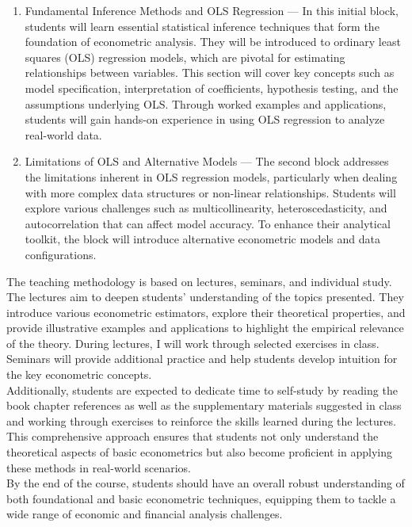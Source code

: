 \documentclass[12pt]{article}
\begin{document}
\begin{enumerate}
    \item Fundamental Inference Methods and OLS Regression --- In this initial block, students will learn essential statistical inference techniques that form the foundation of econometric analysis. They will be introduced to ordinary least squares (OLS) regression models, which are pivotal for estimating relationships between variables. This section will cover key concepts such as model specification, interpretation of coefficients, hypothesis testing, and the assumptions underlying OLS. Through worked examples and applications, students will gain hands-on experience in using OLS regression to analyze real-world data.
    \item Limitations of OLS and Alternative Models --- The second block addresses the limitations inherent in OLS regression models, particularly when dealing with more complex data structures or non-linear relationships. Students will explore various challenges such as multicollinearity, heteroscedasticity, and autocorrelation that can affect model accuracy. To enhance their analytical toolkit, the block will introduce alternative econometric models and data configurations.
\end{enumerate}

The teaching methodology is based on lectures, seminars, and individual study. The lectures aim to deepen students' understanding of the topics presented. They introduce various econometric estimators, explore their theoretical properties, and provide illustrative examples and applications to highlight the empirical relevance of the theory. During lectures, I will work through selected exercises in class. Seminars will provide additional practice and help students develop intuition for the key econometric concepts.\\

Additionally, students are expected to dedicate time to self-study by reading the book chapter references as well as the supplementary materials suggested in class and working through exercises to reinforce the skills learned during the lectures. This comprehensive approach ensures that students not only understand the theoretical aspects of basic econometrics but also become proficient in applying these methods in real-world scenarios.\\

By the end of the course, students should have an overall robust understanding of both foundational and basic econometric techniques, equipping them to tackle a wide range of economic and financial analysis challenges.
\end{document}
